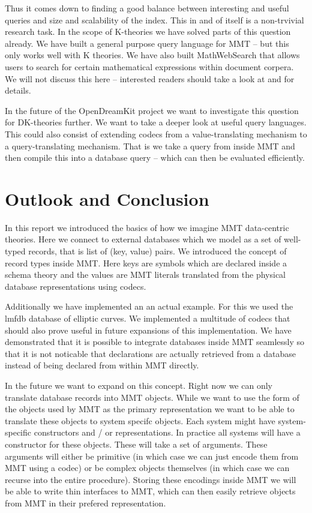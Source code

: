 \documentclass{deliverablereport}
\begin{document}
Thus it comes down to finding a good balance between interesting and useful queries and size and scalability of the index. This in and of itself is a non-trvivial research task. In the scope of K-theories we have solved parts of this question already. We have built a general purpose query language for MMT -- but this only works well with K theories. We have also built MathWebSearch that allows users to search for certain mathematical expressions within document corpera. We will not discuss this here -- interested readers should take a look at \cite{Rabe:qlfml12} and  for details.

In the future of the OpenDreamKit project we want to investigate this question for DK-theories further. We want to take a deeper look at useful query languages. This could also consist of extending codecs from a value-translating mechanism to a query-translating mechanism. That is we take a query from inside MMT and then compile this into a database query -- which can then be evaluated efficiently.

\section{Outlook and Conclusion}\label{sec:conclusion}

In this report we introduced the basics of how we imagine MMT data-centric theories. Here we connect to external databases which we model as a set of well-typed records, that is list of (key, value) pairs. We introduced the concept of record types inside MMT. Here keys are symbols which are declared inside a schema theory and the values are MMT literals translated from the physical database representations using codecs.

Additionally we have implemented an an actual example. For this we used the lmfdb database of elliptic curves. We implemented a multitude of codecs that should also prove useful in future expansions of this implementation. We have demonstrated that it is possible to integrate databases inside MMT seamlessly so that it is not noticable that declarations are actually retrieved from a database instead of being declared from within MMT directly.

In the future we want to expand on this concept. Right now we can only translate database records into MMT objects. While we want to use the form of the objects used by MMT as the primary representation we want to be able to translate these objects to system specifc objects. Each system might have system-specific constructors and / or representations. In practice all systems will have a constructor for these objects. These will take a set of arguments. These arguments will either be primitive (in which case we can just encode them from MMT using a codec) or be complex objects themselves (in which case we can recurse into the entire procedure). Storing these encodings inside MMT we will be able to write thin interfaces to MMT, which can then easily retrieve objects from MMT in their prefered representation.
\end{document}

